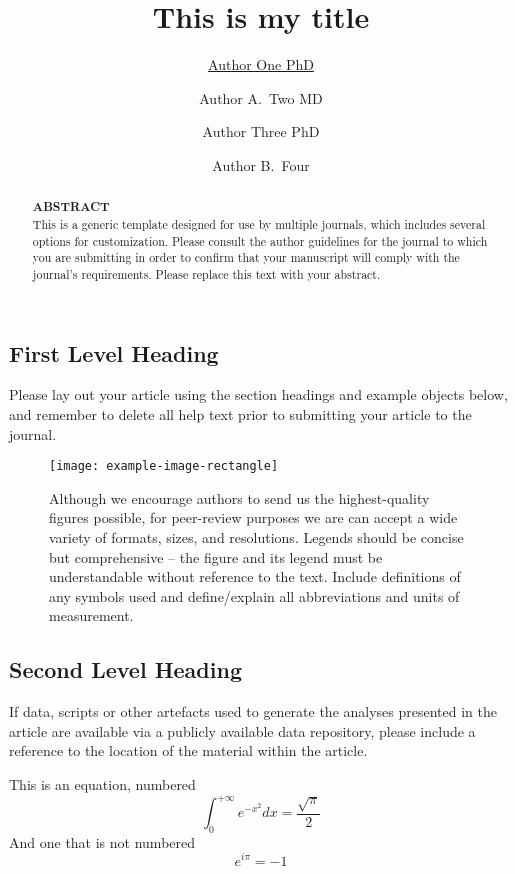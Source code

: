 \documentclass[alpha-refs,serif]{ecotropicos-article}
\title{This is my title}
\author[1\authfn{1}]{
\href{http://orcid.org/0000-000X-XXXX-XXXX}
{Author One PhD
	\href{http://orcid.org/0000-0000-0000-0000}
    {\textcolor{orcidlogocol}{\aiOrcid}}
    }}
\author[2\authfn{1}]{Author A.~Two MD}
\author[2\authfn{2}]{Author Three PhD}
\author[2]{Author B.~Four}
\affil[1]{
\href{https://ror.org/XXXXXXXXX}{Department, Institution, City, State or Province, Postal Code, Country {\aiROR}}
}
\affil[2]{Department, Institution, City, State or Province, Postal Code, Country}
\begin{document}
\maketitle
\begin{abstract}
\begingroup
 \textbf{ABSTRACT}\\[0.35em]
\endgroup
This is a generic template designed for use by multiple journals, which includes several options for customization. Please consult the author guidelines for the journal to which you are submitting in order to confirm that your manuscript will comply with the journal's requirements. Please replace this text with your abstract.

\end{abstract}

\begin{multicols}{2}
\section*{First Level Heading}
Please lay out your article using the section headings and example objects below, and remember to delete all help text prior to submitting your article to the journal.
\end{multicols}


\begin{figure}[bt]
\centering
\texttt{[image: example-image-rectangle]}
\caption{Although we encourage authors to send us the highest-quality figures possible, for peer-review purposes we are can accept a wide variety of formats, sizes, and resolutions. Legends should be concise but comprehensive – the figure and its legend must be understandable without reference to the text. Include definitions of any symbols used and define/explain all abbreviations and units of measurement.}
\end{figure}


\begin{multicols}{2}
\subsection*{Second Level Heading}
If data, scripts or other artefacts used to generate the analyses presented in the article are available via a publicly available data repository, please include a reference to the location of the material within the article.

This is an equation, numbered
\begin{equation}
\int_0^{+\infty}e^{-x^2}dx=\frac{\sqrt{\pi}}{2}
\end{equation}
And one that is not numbered
\begin{equation*}
e^{i\pi}=-1
\end{equation*}

\end{multicols}
\end{document}
